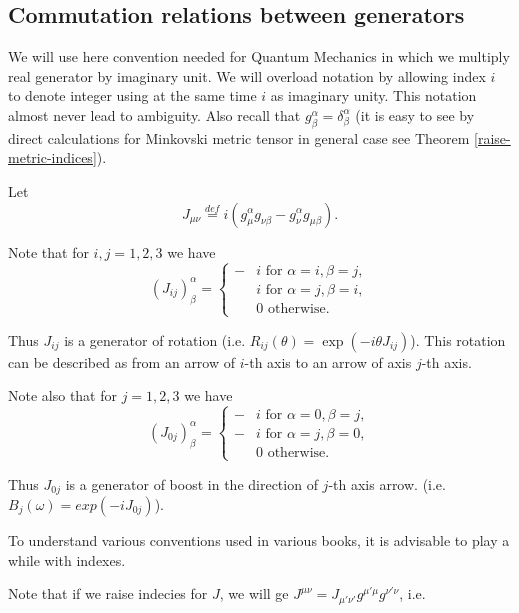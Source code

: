 \documentclass[main.tex]{subfiles}
\begin{document}
\subsection{Commutation relations between generators}

We will use here convention needed for Quantum Mechanics in which we multiply real generator by imaginary unit. We will overload notation by allowing index $i$ to denote integer using at the same time $i$ as imaginary unity. This notation almost never lead to ambiguity. Also recall that $g^\alpha_\beta = \delta^\alpha_\beta$ (it is easy to see by direct calculations for Minkovski metric tensor in general case see Theorem \ref{raise-metric-indices}).

Let
\begin{equation}
J_{\mu\nu} \stackrel{def}{=} i(g^\alpha_\mu g_{\nu\beta} - g^\alpha_\nu g_{\mu\beta}). 
\end{equation}

Note that for $i,j = 1,2,3$ we have
\begin{equation}
(J_{ij})^\alpha_\beta = 
\begin{cases}
-&i \text{ for } \alpha = i, \beta = j,\\
&i \text{ for } \alpha = j, \beta = i,\\
&0 \text{ otherwise. }
\end{cases}
\end{equation}

Thus $J_{ij}$ is a generator of rotation (i.e. $R_{ij}(\theta) = \exp(-i\theta J_{ij})$). This rotation can be described as from an arrow of $i$-th axis to an arrow of axis $j$-th axis.

Note also that for $j = 1,2,3$ we have
\begin{equation}
(J_{0j})^\alpha_\beta = 
\begin{cases}
- &i \text{ for } \alpha = 0, \beta = j,\\
- &i \text{ for } \alpha = j, \beta = 0,\\
&0 \text{ otherwise. }
\end{cases}
\end{equation}

Thus $J_{0j}$ is a generator of boost in the direction of $j$-th axis arrow. (i.e. $B_j(\omega) = exp(-iJ_{0j})$).

To understand various conventions used in various books, it is advisable to play a while with indexes.

Note that if we raise indecies for $J$, we will ge $J^{\mu\nu} = J_{\mu'\nu'}g^{\mu'\mu}g^{\nu'\nu}$, i.e.
\end{document}
